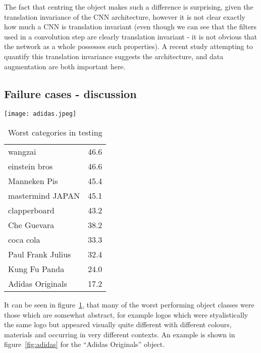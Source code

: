 The fact that centring the object makes such a difference is surprising, given the translation invariance of the CNN architecture, however it is not clear exactly how much a CNN is translation invariant (even though we can see that the filters used in a convolution step are clearly translation invariant - it is not obvious that the network as a whole possesses such properties). A recent study attempting to quantify this translation invariance \cite{EricKauderer-Abrams2016} suggests the architecture, and data augmentation are both important here. 


\subsection {Failure cases - discussion}


\begin{figure*}[t]
    \caption{Example of one hard case in the INSTRE dataset}
\centering
\texttt{[image: adidas.jpeg]}
\label{fig:adidas}
\end{figure*}



\begin{table}[h]
  \centering
    \caption{Worst categories in testing }
  \begin{tabular}{ l l }
  wangzai & 46.6 \\
  einstein bros & 46.6\\
  Manneken Pis & 45.4\\
  mastermind JAPAN & 45.1\\
  clapperboard & 43.2\\
  Che Guevara & 38.2\\
  coca cola & 33.3\\
  Paul Frank Julius & 32.4\\
  Kung Fu Panda & 24.0\\
  Adidas Originals & 17.2\\
    \bottomrule
  \end{tabular}
\label{fig:failure}
\end{table}

It can be seen in figure~\ref{fig:failure}, that many of the worst performing object classes were those which are somewhat abstract, for example logos which were styalistically the same logo but appeared visually quite different with different colours, materials and occurring in very different contexts. An example is shown in figure~\ref{fig:adidas} for the ``Adidas Originals'' object.



